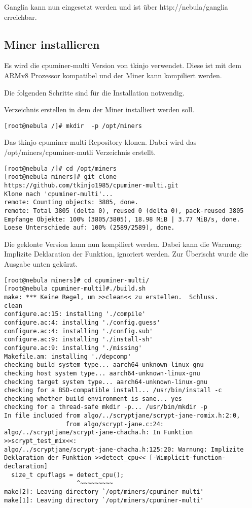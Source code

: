 Ganglia kann nun eingesetzt werden und ist über http://nebula/ganglia erreichbar.

\subsection{Miner installieren}
Es wird die cpuminer-multi Version von tkinjo verwendet. Diese ist mit dem ARMv8 Prozessor kompatibel und der Miner kann kompiliert werden.

Die folgenden Schritte sind für die Installation notwendig.

Verzeichnis erstellen in dem der Miner installiert werden soll.
\begin{lstlisting}
[root@nebula /]# mkdir  -p /opt/miners
\end{lstlisting}

Das tkinjo cpuminer-multi Repository klonen. Dabei wird das /opt/miners/cpuminer-mutli Verzeichnis erstellt.
\begin{lstlisting}
[root@nebula /]# cd /opt/miners
[root@nebula miners]# git clone https://github.com/tkinjo1985/cpuminer-multi.git
Klone nach 'cpuminer-multi'...
remote: Counting objects: 3805, done.
remote: Total 3805 (delta 0), reused 0 (delta 0), pack-reused 3805
Empfange Objekte: 100% (3805/3805), 18.98 MiB | 3.77 MiB/s, done.
Loese Unterschiede auf: 100% (2589/2589), done.
\end{lstlisting}

Die geklonte Version kann nun kompiliert werden. Dabei kann die Warnung: Implizite Deklaration der Funktion, ignoriert werden. Zur Überischt wurde die Ausgabe unten gekürzt.
\begin{lstlisting}
[root@nebula miners]# cd cpuminer-multi/
[root@nebula cpuminer-multi]#./build.sh
make: *** Keine Regel, um >>clean<< zu erstellen.  Schluss.
clean
configure.ac:15: installing './compile'
configure.ac:4: installing './config.guess'
configure.ac:4: installing './config.sub'
configure.ac:9: installing './install-sh'
configure.ac:9: installing './missing'
Makefile.am: installing './depcomp'
checking build system type... aarch64-unknown-linux-gnu
checking host system type... aarch64-unknown-linux-gnu
checking target system type... aarch64-unknown-linux-gnu
checking for a BSD-compatible install... /usr/bin/install -c
checking whether build environment is sane... yes
checking for a thread-safe mkdir -p... /usr/bin/mkdir -p
In file included from algo/../scryptjane/scrypt-jane-romix.h:2:0,
                 from algo/scrypt-jane.c:24:
algo/../scryptjane/scrypt-jane-chacha.h: In Funktion >>scrypt_test_mix<<:
algo/../scryptjane/scrypt-jane-chacha.h:125:20: Warnung: Implizite Deklaration der Funktion >>detect_cpu<< [-Wimplicit-function-declaration]
  size_t cpuflags = detect_cpu();
                    ^~~~~~~~~~
make[2]: Leaving directory `/opt/miners/cpuminer-multi'
make[1]: Leaving directory `/opt/miners/cpuminer-multi'
\end{lstlisting}
 
